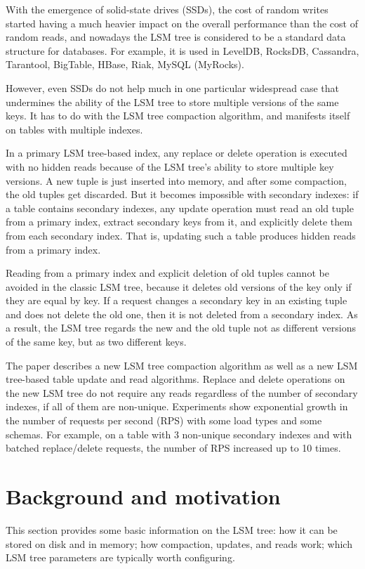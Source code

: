 \documentclass{vldb}
\begin{document}
With the emergence of solid-state drives (SSDs), the cost of random writes started
having a much heavier impact on the overall performance than the cost of random reads,
and nowadays the LSM tree is considered to be a standard data structure for
databases. For example, it is used in LevelDB, RocksDB, Cassandra, Tarantool,
BigTable, HBase, Riak, MySQL (MyRocks).

However, even SSDs do not help much in one particular widespread case that undermines
the ability of the LSM tree to store multiple versions of the same keys. It has to do
with the LSM tree compaction algorithm, and manifests itself on tables with multiple indexes.

In a primary LSM tree-based index, any replace or delete operation is executed
with no hidden reads because of the LSM tree's ability to store multiple key versions.
A new tuple is just inserted into memory, and after some compaction, the old
tuples get discarded. But it becomes impossible with secondary indexes: if a table
contains secondary indexes, any update operation must read an old tuple from a
primary index, extract secondary keys from it, and explicitly delete them from each
secondary index. That is, updating such a table produces hidden reads from a
primary index.

Reading from a primary index and explicit deletion of old tuples cannot be avoided in the
classic LSM tree, because it deletes old versions of the key only if they are
equal by key. If a request changes a secondary key in an existing tuple and
does not delete the old one, then it is not deleted from a secondary index.
As a result, the LSM tree regards the new and the old tuple not as different
versions of the same key, but as two different keys.

The paper describes a new LSM tree compaction algorithm as well as a new LSM
tree-based table update and read algorithms. Replace and delete operations on the new
LSM tree do not require any reads regardless of the number of secondary indexes, if all of them
are non-unique. Experiments show exponential growth in the number of requests per
second (RPS) with some load types and some schemas. For example, on a table with 3
non-unique secondary indexes and with batched replace/delete requests, the number of RPS
increased up to 10 times.

\section{Background and motivation}
This section provides some basic information on the LSM tree: how it can be
stored on disk and in memory; how compaction, updates, and reads work;
which LSM tree parameters are typically worth configuring.
\end{document}
